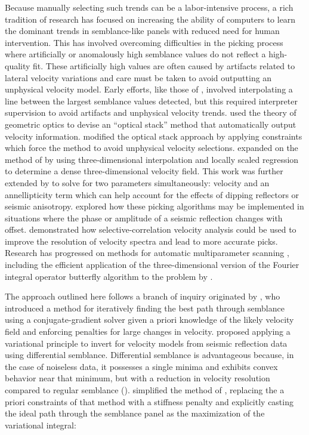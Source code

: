 Because manually selecting such trends can be a labor-intensive process, a rich tradition of research has focused on increasing the ability of computers to learn the dominant trends in semblance-like panels with reduced need for human intervention. This has involved overcoming difficulties in the picking process where artificially or anomalously high semblance values do not reflect a high-quality fit.  These artificially high values are often caused by artifacts related to lateral velocity variations \cite[]{vermeer-1980} and care must be taken to avoid outputting an unphysical velocity model.  Early efforts, like those of \cite{sherwood-1972}, involved interpolating a line between the largest semblance values detected, but this required interpreter supervision to avoid artifacts and unphysical velocity trends.  \cite{bazel-1988} used the theory of geometric optics \cite[]{born-1959} to devise an ``optical stack'' method that automatically output velocity information.  \cite{docin-1995} modified the optical stack approach by applying constraints which force the method to avoid unphysical velocity selections.  \cite{alder-1999} expanded on the method of \cite{docin-1995} by using three-dimensional interpolation and locally scaled regression to determine a dense three-dimensional velocity field. This work was further extended by \cite{siliqi-2003} to solve for two parameters simultaneously: velocity and an annellipticity term which can help account for the effects of dipping reflectors or seismic anisotropy. \cite{arnaud-2004} explored how these picking algorithms may be implemented in situations where the phase or amplitude of a seismic reflection changes with offset.  \cite{larner-2007} demonstrated how selective-correlation velocity analysis could be used to improve the resolution of velocity spectra and lead to more accurate picks. Research has progressed on methods for automatic multiparameter scanning \cite[]{tao-2012}, including the efficient application of the three-dimensional version of the Fourier integral operator butterfly algorithm \cite[]{candes-2009} to the problem  by \cite{hu-2015}.

The approach outlined here follows a branch of inquiry originated by \cite{toldi-1989}, who introduced a method for iteratively finding the best path through semblance using a conjugate-gradient solver given a priori knowledge of the likely velocity field and enforcing penalties for large changes in velocity. \cite{symes-1991} proposed applying a variational principle to invert for velocity models from seismic reflection data using differential semblance.  Differential semblance is advantageous because, in the case of noiseless data, it possesses a single minima and exhibits convex behavior near that minimum, but with a reduction in velocity resolution compared to regular semblance (\citealp{symes-1998,symes-1999,mulder-2002,li-2007}).   \cite{harlan-2001} simplified the method of \cite{toldi-1989}, replacing the a priori constraints of that method with a stiffness penalty and explicitly casting the ideal path through the semblance panel as the maximization of the variational integral:

